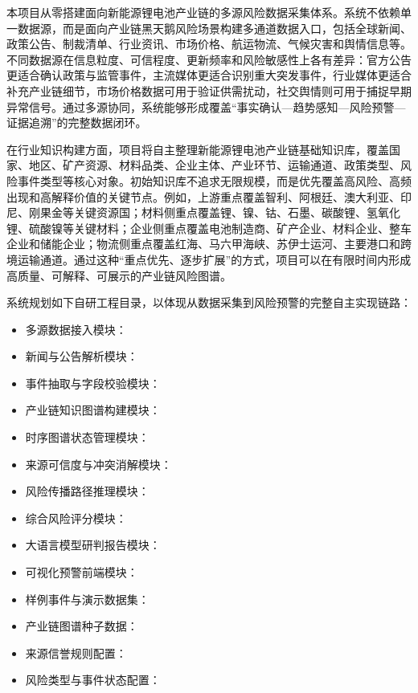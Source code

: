 \documentclass[12pt,a4paper]{article}
\begin{document}
本项目从零搭建面向新能源锂电池产业链的多源风险数据采集体系。系统不依赖单一数据源，而是面向产业链黑天鹅风险场景构建多通道数据入口，包括全球新闻、政策公告、制裁清单、行业资讯、市场价格、航运物流、气候灾害和舆情信息等。不同数据源在信息粒度、可信程度、更新频率和风险敏感性上各有差异：官方公告更适合确认政策与监管事件，主流媒体更适合识别重大突发事件，行业媒体更适合补充产业链细节，市场价格数据可用于验证供需扰动，社交舆情则可用于捕捉早期异常信号。通过多源协同，系统能够形成覆盖“事实确认—趋势感知—风险预警—证据追溯”的完整数据闭环。

在行业知识构建方面，项目将自主整理新能源锂电池产业链基础知识库，覆盖国家、地区、矿产资源、材料品类、企业主体、产业环节、运输通道、政策类型、风险事件类型等核心对象。初始知识库不追求无限规模，而是优先覆盖高风险、高频出现和高解释价值的关键节点。例如，上游重点覆盖智利、阿根廷、澳大利亚、印尼、刚果金等关键资源国；材料侧重点覆盖锂、镍、钴、石墨、碳酸锂、氢氧化锂、硫酸镍等关键材料；企业侧重点覆盖电池制造商、矿产企业、材料企业、整车企业和储能企业；物流侧重点覆盖红海、马六甲海峡、苏伊士运河、主要港口和跨境运输通道。通过这种“重点优先、逐步扩展”的方式，项目可以在有限时间内形成高质量、可解释、可展示的产业链风险图谱。

系统规划如下自研工程目录，以体现从数据采集到风险预警的完整自主实现链路：
\begin{itemize}
    \item 多源数据接入模块：
    \item 新闻与公告解析模块：
    \item 事件抽取与字段校验模块：
    \item 产业链知识图谱构建模块：
    \item 时序图谱状态管理模块：
    \item 来源可信度与冲突消解模块：
    \item 风险传播路径推理模块：
    \item 综合风险评分模块：
    \item 大语言模型研判报告模块：
    \item 可视化预警前端模块：
    \item 样例事件与演示数据集：
    \item 产业链图谱种子数据：
    \item 来源信誉规则配置：
    \item 风险类型与事件状态配置：
\end{itemize}
\end{document}
